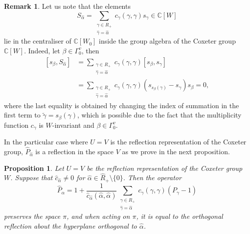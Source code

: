 \documentclass[12pt]{amsart}
\newcommand{\C}{\mathbb C}
\numberwithin{equation}{section}
\newtheorem{prop}[theorem]{Proposition}
\theoremstyle{definition}
\newtheorem{remark}[theorem]{Remark}
\begin{document}
\begin{remark}
    Let us note that the elements
    \begin{equation*}
        S_{\widehat{\alpha}} = \sum_{\substack{ \gamma \in R_+ \\\widehat{\gamma} = \widehat{\alpha}}} 
        c_{\gamma}(\gamma, \gamma) s_{\gamma} \in \C[W]
    \end{equation*}
    lie in the centraliser of $\mathbb{C}[W_0]$ inside the group algebra of the Coxeter group $\mathbb{C}[W]$. Indeed, let $\beta \in \Gamma_0^v$, then
    \begin{equation*}
    \begin{aligned}
        [s_{\beta}, S_{\widehat{\alpha}}] &= 
        \sum\limits_{\substack{\gamma \in R_+ \\ \widehat{\gamma} = \widehat{\alpha}}}
        c_{\gamma} (\gamma, \gamma) [s_{\beta}, s_{\gamma}] \\
        &= 
        \sum\limits_{\substack{\gamma \in R_+ \\ \widehat{\gamma} = \widehat{\alpha}}}
        c_{\gamma} (\gamma, \gamma) (s_{s_{\beta}(\gamma)} - s_{\gamma}) s_{\beta} = 0,
    \end{aligned}
    \end{equation*}
    where the last equality is obtained by changing the index of summation in the first term to
    $\widetilde{\gamma} = s_{\beta} (\gamma)$, which is possible due to the fact that 
    the multiplicity function $c_{\gamma}$ is $W$-invariant and $\beta \in \Gamma_0^v$.
\end{remark}

In the particular case where $U = V$ is the reflection representation of the Coxeter group, $\widehat{P}_{\widehat{\alpha}}$ is %
a reflection in the space $V$ as we prove in the next proposition.
\begin{prop} \label{projref}
Let $U = V$ be the reflection representation of the Coxeter group $W$. 
Suppose that $\widehat{c}_{\widehat{\alpha}} \neq 0$ for  $\widehat{\alpha} \in \widehat{R}_+ \setminus \{0\}$. Then the operator
\begin{equation}
    \widehat{P}_{\widehat{\alpha}} = 1 + \frac{1}{\widehat{c}_{\widehat{\alpha}} (\widehat{\alpha}, \widehat{\alpha})} \sum_{\substack{ \gamma \in R_+ \\\widehat{\gamma} = \widehat{\alpha}}} 
    c_{\gamma}(\gamma, \gamma) (P_{\gamma} - 1)  \label{P hat}
\end{equation}
preserves
the space $\pi$, and when acting on $\pi$, it is equal to the orthogonal reflection 
about the hyperplane orthogonal to $\widehat{\alpha}$.
\end{prop}
\end{document}
